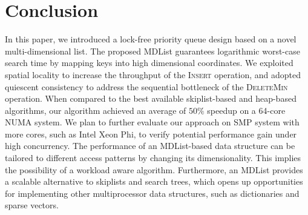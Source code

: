 \documentclass[10pt,journal,letter,compsoc]{IEEEtran}
\begin{document}
\section{Conclusion}
\label{sec:conclusion}
In this paper, we introduced a lock-free priority queue design based on a novel multi-dimensional list.
The proposed MDList guarantees logarithmic worst-case search time by mapping keys into high dimensional coordinates.
We exploited spatial locality to increase the throughput of the \textsc{Insert} operation, and adopted quiescent consistency to address the sequential bottleneck of the \textsc{DeleteMin} operation.
When compared to the best available skiplist-based and heap-based algorithms, our algorithm achieved an average of $50\%$ speedup on a 64-core NUMA system.
We plan to further evaluate our approach on SMP system with more cores, such as Intel Xeon Phi, to verify potential performance gain under high concurrency.
The performance of an MDList-based data structure can be tailored to different access patterns by changing its dimensionality.
This implies the possibility of a workload aware algorithm.
Furthermore, an MDList provides a scalable alternative to skiplists and search trees, which opens up opportunities for implementing other multiprocessor data structures, such as dictionaries and sparse vectors. 



\end{document}

